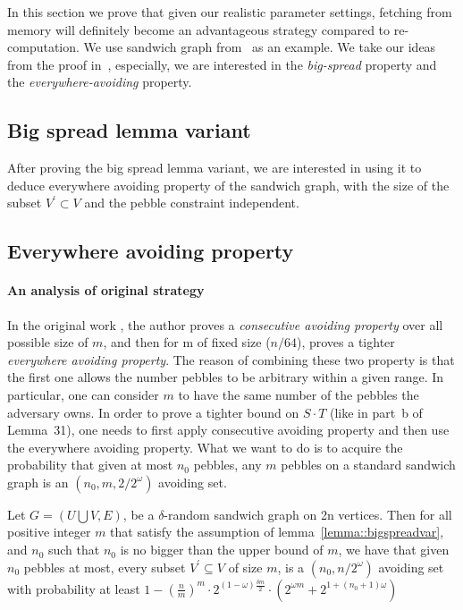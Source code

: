In this section we prove that given our realistic parameter settings, fetching from memory will definitely become
an advantageous strategy compared to re-computation. We use sandwich graph from~\cite{corrigan2016balloon} as an
example. We take our ideas from the proof in~\cite{corrigan2016balloon}, especially, we are interested in the
\textit{big-spread} property and the \textit{everywhere-avoiding} property.

\subsection{Big spread lemma variant}


After proving the big spread lemma variant, we are interested in using it to deduce everywhere avoiding property of the
sandwich graph, with the size of the subset $V^\prime \subset V$ and the pebble constraint independent.

\subsection{Everywhere avoiding property}
\paragraph{An analysis of original strategy}
In the original work \cite{corrigan2016balloon}, the author proves a \textit{consecutive avoiding property} over all possible size of $m$, and
then for m of fixed size ($n/64$), proves a tighter \textit{everywhere avoiding property}. The reason of combining these two property is that
the first one allows the number pebbles to be arbitrary within a given range. In particular, one can consider $m$ to have the same number of the
pebbles the adversary owns. In order to prove a tighter bound on $S \cdot T$ (like in part~b of Lemma~31), one needs to first apply consecutive
avoiding property and then use the everywhere avoiding property. What we want to do is to acquire the probability that given at most $n_0$ pebbles,
any $m$ pebbles on a standard sandwich graph is an $(n_0, m, 2/2^\omega)$ avoiding set.

\begin{lemma}\label{lemma::everyAvoid}
  Let $G = (U \bigcup V, E)$, be a $\delta$-random sandwich graph on 2n vertices. Then for all positive integer $m$ that satisfy the assumption
  of lemma~\ref{lemma::bigspreadvar}, and $n_0$ such that $n_0$ is no bigger than the upper bound of $m$, we have that given $n_0$ pebbles at most,
  every subset $V^\prime \subseteq V$ of size $m$, is a $(n_0, n/2^\omega)$ avoiding set with probability at least
  $1 - (\frac{n}{m})^m \cdot 2^{(1-\omega)\frac{\delta m}{2}} \cdot (2^{\omega m} + 2^{1 + (n_0 + 1) \omega})$
\end{lemma}

